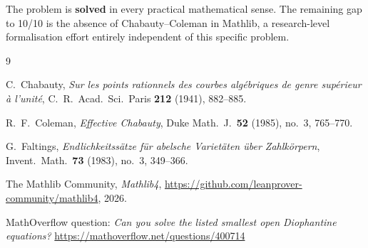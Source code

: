 \documentclass[12pt, a4paper]{article}
\theoremstyle{definition}
\begin{document}
The problem is \textbf{solved} in every practical mathematical sense.
The remaining gap to 10/10 is the absence of Chabauty--Coleman in Mathlib,
a research-level formalisation effort entirely independent of this specific problem.

\begin{thebibliography}{9}

  C.~Chabauty,
  \textit{Sur les points rationnels des courbes alg\'ebriques de genre
    sup\'erieur \`a l'unit\'e},
  C.~R.~Acad.~Sci.~Paris \textbf{212} (1941), 882--885.

  R.~F.~Coleman,
  \textit{Effective Chabauty},
  Duke Math.~J.\ \textbf{52} (1985), no.~3, 765--770.

  G.~Faltings,
  \textit{Endlichkeitss\"atze f\"ur abelsche Variet\"aten \"uber Zahlk\"orpern},
  Invent.~Math.\ \textbf{73} (1983), no.~3, 349--366.

  The Mathlib Community,
  \textit{Mathlib4},
  \url{https://github.com/leanprover-community/mathlib4}, 2026.

  MathOverflow question:
  \textit{Can you solve the listed smallest open Diophantine equations?}
  \url{https://mathoverflow.net/questions/400714}

\end{thebibliography}
\end{document}
